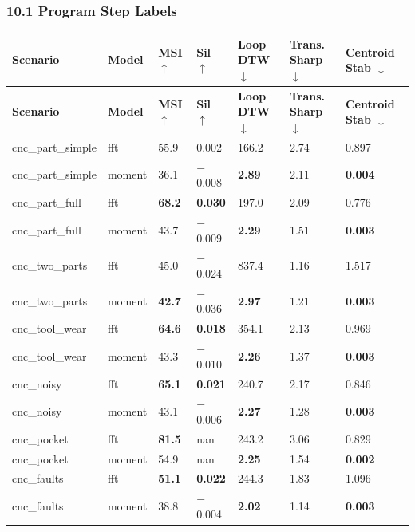 \documentclass[11pt,a4paper]{article}
\begin{document}
\subsubsection{10.1 Program Step Labels}

\begin{longtable}{|l|l|l|l|l|l|l|}
\hline
\textbf{Scenario} & \textbf{Model} & \textbf{MSI $\uparrow$} & \textbf{Sil $\uparrow$} & \textbf{Loop DTW $\downarrow$} & \textbf{Trans. Sharp $\downarrow$} & \textbf{Centroid Stab $\downarrow$} \\
\hline
\endfirsthead
\hline
\textbf{Scenario} & \textbf{Model} & \textbf{MSI $\uparrow$} & \textbf{Sil $\uparrow$} & \textbf{Loop DTW $\downarrow$} & \textbf{Trans. Sharp $\downarrow$} & \textbf{Centroid Stab $\downarrow$} \\
\hline
\endhead
\hline
\endfoot
cnc\_part\_simple & fft & 55.9 & 0.002 & 166.2 & 2.74 & 0.897 \\
\hline
cnc\_part\_simple & moment & 36.1 & $-$0.008 & \textbf{2.89} & 2.11 & \textbf{0.004} \\
\hline
cnc\_part\_full & fft & \textbf{68.2} & \textbf{0.030} & 197.0 & 2.09 & 0.776 \\
\hline
cnc\_part\_full & moment & 43.7 & $-$0.009 & \textbf{2.29} & 1.51 & \textbf{0.003} \\
\hline
cnc\_two\_parts & fft & 45.0 & $-$0.024 & 837.4 & 1.16 & 1.517 \\
\hline
cnc\_two\_parts & moment & \textbf{42.7} & $-$0.036 & \textbf{2.97} & 1.21 & \textbf{0.003} \\
\hline
cnc\_tool\_wear & fft & \textbf{64.6} & \textbf{0.018} & 354.1 & 2.13 & 0.969 \\
\hline
cnc\_tool\_wear & moment & 43.3 & $-$0.010 & \textbf{2.26} & 1.37 & \textbf{0.003} \\
\hline
cnc\_noisy & fft & \textbf{65.1} & \textbf{0.021} & 240.7 & 2.17 & 0.846 \\
\hline
cnc\_noisy & moment & 43.1 & $-$0.006 & \textbf{2.27} & 1.28 & \textbf{0.003} \\
\hline
cnc\_pocket & fft & \textbf{81.5} & nan & 243.2 & 3.06 & 0.829 \\
\hline
cnc\_pocket & moment & 54.9 & nan & \textbf{2.25} & 1.54 & \textbf{0.002} \\
\hline
cnc\_faults & fft & \textbf{51.1} & \textbf{0.022} & 244.3 & 1.83 & 1.096 \\
\hline
cnc\_faults & moment & 38.8 & $-$0.004 & \textbf{2.02} & 1.14 & \textbf{0.003} \\
\hline
\end{longtable}
\end{document}

